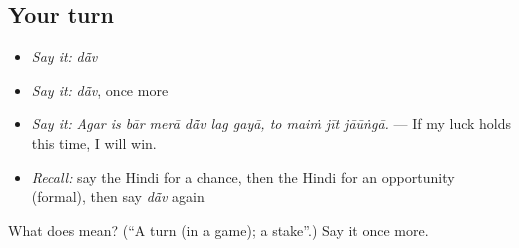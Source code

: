 \subsection*{Your turn}
\begin{itemize}
\raggedright
  \item \emph{Say it:} \emph{dā̃v}
  \item \emph{Say it:} \emph{dā̃v}, once more
  \item \emph{Say it:} \emph{Agar is bār merā dā̃v lag gayā, to maiṁ jīt jāūṅgā.} — If my luck holds this time, I will win.
  \item \emph{Recall:} say the Hindi for a chance, then the Hindi for an opportunity (formal), then say \emph{dā̃v} again
\end{itemize}

\begin{tcolorbox}[breakable,colback=teal!4,colframe=teal!35!black,title={Before you move on}]
What does  mean? (\textquotedblleft{}A turn (in a game); a stake\textquotedblright{}.) Say it once more.
\end{tcolorbox}
